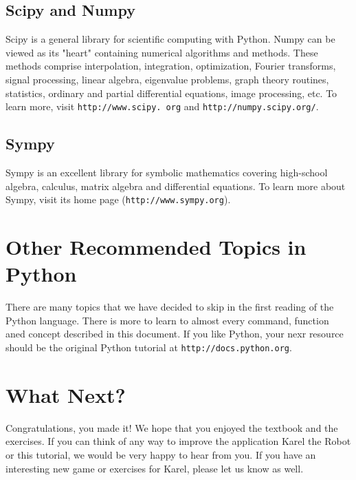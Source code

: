 \documentclass[article,A4,12pt]{llncs}
\begin{document}
\subsection{Scipy and Numpy}

Scipy is a general library for scientific computing with 
Python. Numpy can be viewed as its "heart" containing numerical 
algorithms and methods. These methods comprise interpolation, 
integration, optimization, Fourier transforms, signal processing, 
linear algebra, eigenvalue problems, graph theory routines,
statistics, ordinary and partial differential equations,
image processing, etc. To learn more, visit 
{\tt http://www.scipy. org} and {\tt http://numpy.scipy.org/}. 

\subsection{Sympy}

Sympy is an excellent library for symbolic mathematics covering high-school 
algebra, calculus, matrix algebra and differential equations. To learn more
about Sympy, visit its home page ({\tt http://www.sympy.org}).


\section{Other Recommended Topics in Python} \label{sec:adv}

There are many topics that we have decided to skip in the first reading 
of the Python language. There is more to learn to almost every command,
function aned concept described in this document. If you like Python,
your nexr resource should be the original Python tutorial at 
{\tt http://docs.python.org}. 






\section{What Next?}

Congratulations, you made it! We hope that you enjoyed the textbook and the 
exercises. If you can think of any way to improve the application Karel the 
Robot or this tutorial, we would be very happy to hear from you. If you 
have an interesting new game or exercises for Karel, please let us know as well. 
\end{document}

